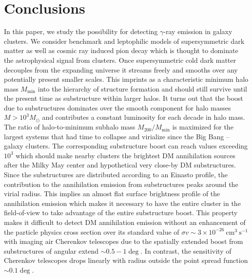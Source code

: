 \documentclass[10pt,aps,pra,reprint,amsmath,amsfonts,amssymb,showpacs]{revtex4-1}
\newcommand{\msun}{M_\odot}
\begin{document}
%

\clearpage 

\section{Conclusions}

In this paper, we study the possibility for detecting $\gamma$-ray emission in
galaxy clusters. We consider benchmark and leptophilic models of supersymmetric
dark matter as well as cosmic ray induced pion decay which is thought to
dominate the astrophysical signal from clusters. Once supersymmetric cold dark
matter decouples from the expanding universe it streams freely and smooths over
any potentially present smaller scales. This imprints as a characteristic
minimum halo mass $M_\mathrm{min}$ into the hierarchy of structure formation and
should still survive until the present time as substructure within larger
halos. It turns out that the boost due to substructures dominates over the
smooth component for halo masses $M>10^3 \msun$ and contributes a constant
luminosity for each decade in halo mass. The ratio of halo-to-minimum subhalo
mass $M_{200}/M_\mathrm{min}$ is maximized for the largest systems that had time
to collapse and virialize since the Big Bang -- galaxy clusters. The
corresponding substructure boost can reach values exceeding $10^3$ which should
make nearby clusters the brightest DM annihilation sources after the Milky May
center and hypothetical very close-by DM substructures. Since the substructures
are distributed according to an Einasto profile, the contribution to the
annihilation emission from substructures peaks around the virial radius. This
implies an almost flat surface brightness profile of the annihilation emission
which makes it necessary to have the entire cluster in the field-of-view to take
advantage of the entire substructure boost.  This property makes it difficult to
detect DM annihilation emission without an enhancement of the particle physics
cross section over its standard value of $\sigma v\sim 3\times 10^{-26}
~\mathrm{cm}^3~\mathrm{s}^{-1}$ with imaging air Cherenkov telescopes due to the
spatially extended boost from substructures of angular extend $\sim
0.5-1\deg$. In contrast, the sensitivity of Cherenkov telescopes drops linearly
with radius outside the point spread function $\sim0.1\deg$.
\end{document}

